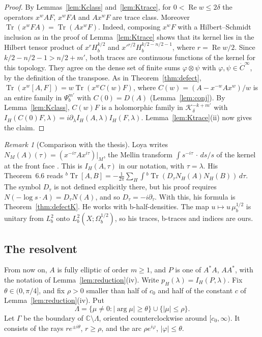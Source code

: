 \documentclass[11pt,oneside,reqno]{article}
\newcommand{\C}{\mathbb C}
\DeclareMathOperator{\Tr}{Tr}
\theoremstyle{plain}
\theoremstyle{definition}
\theoremstyle{remark}
\newtheorem{remark}[theorem]{Remark}
\begin{document}
\begin{proof}
By Lemmas~\ref{lem:Kclass} and~\ref{lem:Ktrace}, for
\(0<\operatorname{Re}w\leq2\delta\) the operators \(x^wAF\), \(x^wFA\) and
\(Ax^wF\) are trace class. Moreover \(\Tr(x^wFA)=\Tr(Ax^wF)\). Indeed, composing
\(x^wF\) with a Hilbert--Schmidt inclusion as in the proof of
Lemma~\ref{lem:Ktrace} shows that its kernel lies in the Hilbert tensor
product of \(x^{r}H^{k/2}_b\) and \(x'^{r/2}H^{k/2-n/2-1}_b\), where
\(r=\operatorname{Re}w/2\). Since \(k/2-n/2-1>n/2+m'\), both traces are
continuous functions of the kernel for this topology. They agree on the
dense set of finite sums \(\varphi\otimes\psi\) with
\(\varphi,\psi\in\dot C^\infty\), by the definition of the transpose. As in Theorem~\ref{thm:defect},
\(\Tr(x^w[A,F])=w\Tr(x^wC(w)F)\), where \(C(w)=(A-x^{-w}Ax^w)/w\) is an
entire family in \(\Psi_b^{m'}\) with \(C(0)=D(A)\) (Lemma~\ref{lem:conj}). By
Lemma~\ref{lem:Kclass}, \(C(w)F\) is a holomorphic family in
\(\mathcal K^{-k+m'}_\delta\) with
\(I_H(C(0)F,\lambda)=i\partial_\lambda I_H(A,\lambda)I_H(F,\lambda)\).
Lemma~\ref{lem:Ktrace}(ii) now gives the claim.
\end{proof}

\begin{remark}[Comparison with the thesis]\label{rem:defect-thesis}
Loya writes \(N_M(A)(\tau)=(x^{-i\tau}Ax^{i\tau})|_M\), the Mellin transform
\(\int s^{-i\tau}\,\cdot\,ds/s\) of the kernel at the front face
\cite[Sect.~2.4]{LoyaThesis}. This is \(I_H(A,\tau)\) in our notation, with
\(\tau=\lambda\). His Theorem~6.6 reads
\({}^b\Tr[A,B]=-\frac1{2\pi}\sum_H\int{}^b\Tr(D_\tau N_H(A)N_H(B))\,d\tau\).
The symbol \(D_\tau\) is not defined explicitly there, but his proof
requires \(N(-\log s\cdot A)=D_\tau N(A)\), and so \(D_\tau=-i\partial_\tau\).
With this, his formula is Theorem~\ref{thm:defectK}. He works with
b-half-densities. The map \(u\mapsto u\,\mu_b^{1/2}\) is unitary from
\(L^2_b\) onto \(L^2_b(X;\Omega_b^{1/2})\), so his traces, b-traces and
indices are ours.
\end{remark}

\subsection{The resolvent}\label{subsec:resolvent}

From now on, \(A\) is fully elliptic of order \(m\geq1\), and \(P\) is one
of \(A^*A\), \(AA^*\), with the notation of Lemma~\ref{lem:reduction}(iv).
Write \(p_H(\lambda)=I_H(P,\lambda)\). Fix \(\theta\in(0,\pi/4]\), and
fix \(\rho>0\) smaller than half of \(c_0\) and half of the constant \(c\) of
Lemma~\ref{lem:reduction}(iv). Put
\[
 \Lambda=\{\mu\neq0:|\arg\mu|\geq\theta\}\cup\{|\mu|\leq\rho\}.
\]
Let \(\Gamma\) be the boundary of \(\C\setminus\Lambda\), oriented
counterclockwise around \([c_0,\infty)\). It consists of the rays
\(re^{\pm i\theta}\), \(r\geq\rho\), and the arc
\(\rho e^{i\varphi}\), \(|\varphi|\leq\theta\).
\end{document}
